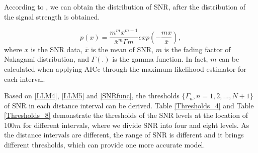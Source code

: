 \documentclass[conference]{IEEEtran}
\begin{document}
According to \cite{Digital_Communication_over_Fading_Channels}, we can obtain the distribution of SNR,  after the distribution of the signal strength is obtained.

\begin{equation}
p(x)=\frac{m^{m}x^{m-1}}{\bar{x}^{m}\Gamma{m}}exp(-\frac{mx}{\bar{x}}),
\label{SNRfunc}
\end{equation}
where $x$ is the SNR data, $\bar{x}$ is the mean of SNR, $m$ is the fading factor of Nakagami distribution, and $\Gamma(.)$ is the gamma function. In fact, $m$ can be calculated when applying AICc through the maximum likelihood estimator for each interval.

Based on \eqref{LLM4}, \eqref{LLM5} and \eqref{SNRfunc}, the thresholds $\{\Gamma_{n},n=1,2,...,N+1\}$ of SNR in each distance interval can be derived. Table \ref{Thresholds_4} and Table \ref{Thresholds_8} demonstrate the thresholds of the SNR levels at the location of $100m$ for different intervals, where we divide SNR into four and eight levels. As the distance intervals are different, the range of SNR is different and it brings different thresholds, which can provide one more accurate model.
\end{document}
